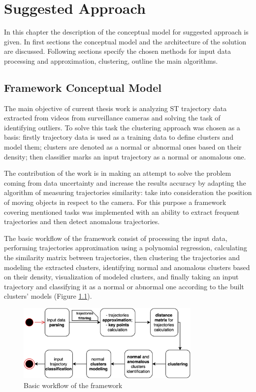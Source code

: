 \chapter{Suggested Approach}
\label{ch:Suggested Approach}

In this chapter the description of the conceptual model for suggested approach is given. In first sections the conceptual model and the architecture of the solution are discussed. Following sections specify the chosen methods for input data processing and approximation, clustering, outline the main algorithms.

\section{Framework Conceptual Model}
\label{ch:Framework Conceptual Model}

The main objective of current thesis work is analyzing ST trajectory data extracted from videos from surveillance cameras and solving the task of identifying outliers. To solve this task the clustering approach was chosen as a basis: firstly trajectory data is used as a training data to define clusters and model them; clusters are denoted as a normal or abnormal ones based on their density; then classifier marks an input trajectory as a normal or anomalous one. 

The contribution of the work is in making an attempt to solve the problem coming from data uncertainty and increase the results accuracy by adapting the algorithm of measuring trajectories similarity:  take into consideration the position of moving objects in respect to the camera. For this purpose a framework covering mentioned tasks was implemented with an ability to extract frequent trajectories and then detect anomalous trajectories.

The basic workflow of the framework consist of processing the input data, performing trajectories approximation using a polynomial regression, calculating the similarity matrix between trajectories, then clustering the trajectories and modeling the extracted clusters, identifying normal and anomalous clusters based on their density, visualization of modeled clusters, and finally taking an input trajectory and classifying it as a normal or abnormal one according to the built clusters' models (Figure \ref{fig:flowchart}).

\begin{figure}[!htb]
	\centering{}
	\includegraphics[width=0.8\textwidth]{images/flowchart.png}
	\caption{Basic workflow of the framework}
	\label{fig:flowchart}
\end{figure}

